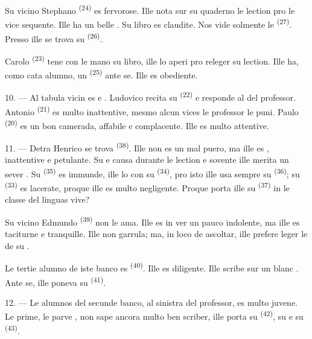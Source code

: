 Su vicino Stephano \textsuperscript{(24)} es fervorose. Ille nota sur su
quaderno le lection pro le vice sequente. Ille ha un belle
. Su libro es claudite. Nos vide solmente le 
\textsuperscript{(27)}. Presso ille se trova su 
\textsuperscript{(26)}.

Carolo \textsuperscript{(23)} tene con le mano su libro, ille lo aperi pro
releger su lection. Ille ha, como cata alumno, un 
\textsuperscript{(25)} ante se. Ille es obediente.

10. --- Al tabula vicin es  e . Ludovico
recita su  \textsuperscript{(22)} e responde al
 del professor. Antonio \textsuperscript{(21)} es multo
inattentive, mesmo alcun vices le professor le puni. Paulo
\textsuperscript{(20)} es un bon camerada, affabile e complacente. Ille es
multo attentive.

\VUsaut{4.2mm}
\VUsaut{3.2mm}

11. --- Detra Henrico se trova  \textsuperscript{(38)}. Ille non
es un mal puero, ma ille es , inattentive e petulante. Su
 e  causa  durante
le lection e sovente ille merita un sever . Su
 \textsuperscript{(35)} es immunde, ille lo
 con su  \textsuperscript{(34)}, pro
isto ille usa sempre su  \textsuperscript{(36)}; su
 \textsuperscript{(33)} es lacerate, proque ille es multo
negligente. Proque porta ille su  \textsuperscript{(37)} in
le classe del linguas vive?

Su vicino Edmundo \textsuperscript{(39)} non le ama. Ille es in ver un pauco
indolente, ma ille es taciturne e tranquille. Ille non garrula; ma, in loco de
ascoltar, ille prefere leger le  de su .

Le tertie alumno de iste banco es  \textsuperscript{(40)}. Ille
es diligente. Ille scribe sur un blanc . Ante se, ille
poneva su  \textsuperscript{(41)}.

12. --- Le alumnos del secunde banco, al sinistra del professor, es multo juvene.
Le prime, le parve , non sape ancora multo ben scriber, ille
porta su  \textsuperscript{(42)}, su  e
su  \textsuperscript{(43)}.

